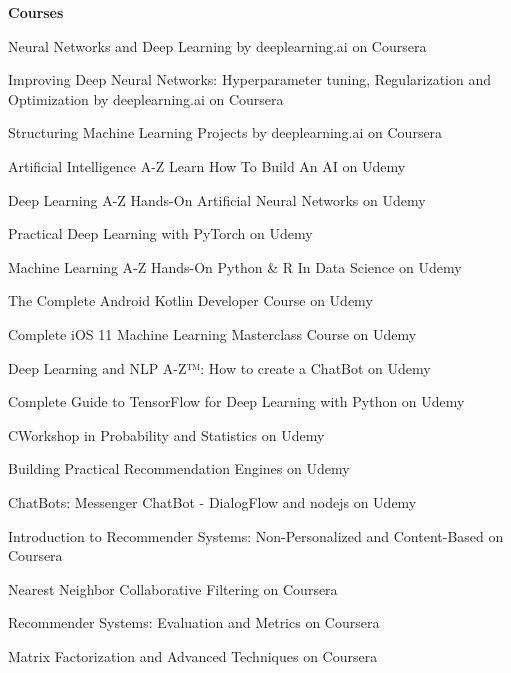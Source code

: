   \begin{cventries}

 \cventry
 {\bf Courses}
 {}
 {}
 {}
    {
      \begin{cvitems} %
        \item {Neural Networks and Deep Learning by deeplearning.ai on Coursera}
        \item {Improving Deep Neural Networks: Hyperparameter tuning, Regularization and Optimization by deeplearning.ai on Coursera}
        \item {Structuring Machine Learning Projects by deeplearning.ai on Coursera}
        \item {Artificial Intelligence A-Z Learn How To Build An AI on Udemy}
        \item {Deep Learning A-Z Hands-On Artificial Neural Networks on Udemy}
        \item {Practical Deep Learning with PyTorch on Udemy}
        \item {Machine Learning A-Z Hands-On Python \& R In Data Science on Udemy}
        \item {The Complete Android Kotlin Developer Course on Udemy}
        \item {Complete iOS 11 Machine Learning Masterclass Course on Udemy}
        \item {Deep Learning and NLP A-Z™: How to create a ChatBot on Udemy}
        \item {Complete Guide to TensorFlow for Deep Learning with Python on Udemy}
        \item {CWorkshop in Probability and Statistics on Udemy}
        \item {Building Practical Recommendation Engines on Udemy}
        \item {ChatBots: Messenger ChatBot - DialogFlow and nodejs on Udemy}
        \item {Introduction to Recommender Systems: Non-Personalized and Content-Based  on Coursera}
        \item {Nearest Neighbor Collaborative Filtering on Coursera}
        \item {Recommender Systems: Evaluation and Metrics on Coursera}
        \item {Matrix Factorization and Advanced Techniques on Coursera}
      \end{cvitems}
    }

\end{cventries}
